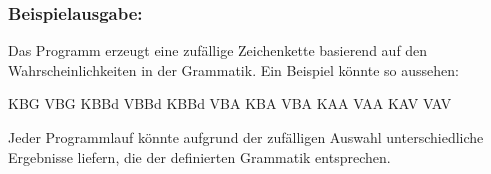 \documentclass[
]{article}
\begin{document}
\subsubsection{\texorpdfstring{\textbf{Beispielausgabe:}}{Beispielausgabe:}}\label{beispielausgabe}

Das Programm erzeugt eine zufällige Zeichenkette basierend auf den
Wahrscheinlichkeiten in der Grammatik. Ein Beispiel könnte so aussehen:

KBG VBG KBBd VBBd KBBd VBA KBA VBA KAA VAA KAV VAV

Jeder Programmlauf könnte aufgrund der zufälligen Auswahl
unterschiedliche Ergebnisse liefern, die der definierten Grammatik
entsprechen.
\end{document}
